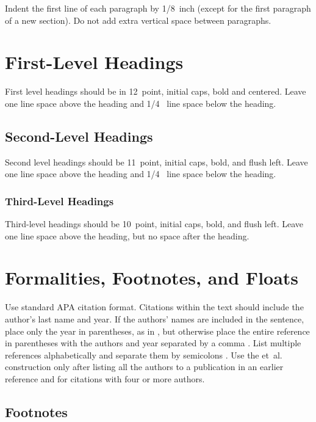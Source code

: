\documentclass[10pt,letterpaper]{article}
\begin{document}
Indent the first line of each paragraph by 1/8~inch (except for the
first paragraph of a new section). Do not add extra vertical space
between paragraphs.


\section{First-Level Headings}

First level headings should be in 12~point, initial caps, bold and
centered. Leave one line space above the heading and 1/4~ line space
below the heading.


\subsection{Second-Level Headings}

Second level headings should be 11~point, initial caps, bold, and
flush left. Leave one line space above the heading and 1/4~ line
space below the heading.


\subsubsection{Third-Level Headings}

Third-level headings should be 10~point, initial caps, bold, and flush
left. Leave one line space above the heading, but no space after the
heading.


\section{Formalities, Footnotes, and Floats}

Use standard APA citation format. Citations within the text should
include the author's last name and year. If the authors' names are
included in the sentence, place only the year in parentheses, as in
, but otherwise place the entire reference in
parentheses with the authors and year separated by a comma
\cite{NewellSimon1972a}. List multiple references alphabetically and
separate them by semicolons
\cite{ChalnickBillman1988a,NewellSimon1972a}. Use the
et~al. construction only after listing all the authors to a
publication in an earlier reference and for citations with four or
more authors.


\subsection{Footnotes}
\end{document}
